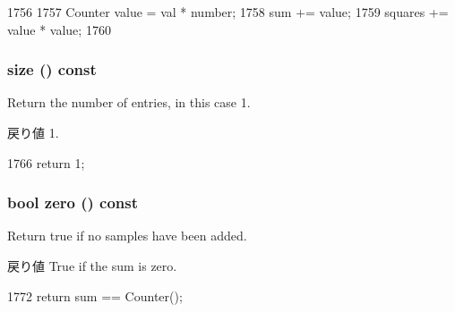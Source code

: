 \begin{DoxyCode}
1756     {
1757         Counter value = val * number;
1758         sum += value;
1759         squares += value * value;
1760     }
\end{DoxyCode}
\hypertarget{classStats_1_1AvgSampleStor_a503ab01f6c0142145d3434f6924714e7}{
\subsubsection[{size}]{ size () const}}
\label{classStats_1_1AvgSampleStor_a503ab01f6c0142145d3434f6924714e7}
Return the number of entries, in this case 1. \begin{DoxyReturn}{戻り値}
1. 
\end{DoxyReturn}



\begin{DoxyCode}
1766 { return 1; }
\end{DoxyCode}
\hypertarget{classStats_1_1AvgSampleStor_a4e72b01b727d3165e75cba84eb507491}{
\subsubsection[{zero}]{\setlength{\rightskip}{0pt plus 5cm}bool zero () const}}
\label{classStats_1_1AvgSampleStor_a4e72b01b727d3165e75cba84eb507491}
Return true if no samples have been added. \begin{DoxyReturn}{戻り値}
True if the sum is zero. 
\end{DoxyReturn}



\begin{DoxyCode}
1772 { return sum == Counter(); }
\end{DoxyCode}


